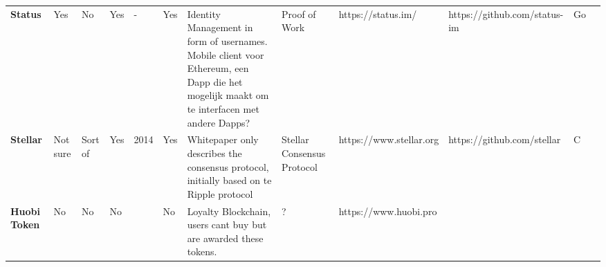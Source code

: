 \begin{table}[htbp]
\begin{adjustbox}{width=25cm, height=6cm, angle=270}
\begin{tabular}{llllrlp{17.915em}rlrrr}
      \rowcolor[rgb]{ .267,  .447,  .769} \textcolor[rgb]{ 1,  1,  1}{\textbf{Status}} & \cellcolor[rgb]{ .776,  .937,  .808}\textcolor[rgb]{ 0,  .38,  0}{Yes} & \cellcolor[rgb]{ 1,  .78,  .808}\textcolor[rgb]{ .612,  0,  .024}{No} & \cellcolor[rgb]{ .776,  .937,  .808}\textcolor[rgb]{ 0,  .38,  0}{Yes} & \multicolumn{1}{l}{\cellcolor[rgb]{ 1,  1,  1}-} & \cellcolor[rgb]{ .776,  .937,  .808}\textcolor[rgb]{ 0,  .38,  0}{Yes} & \cellcolor[rgb]{ .851,  .882,  .949}\textcolor[rgb]{ .188,  .329,  .588}{Identity Management in form of usernames. Mobile client voor Ethereum, een Dapp die het mogelijk maakt om te interfacen met andere Dapps?} & \multicolumn{1}{l}{\cellcolor[rgb]{ .851,  .882,  .949}\textcolor[rgb]{ .188,  .329,  .588}{Proof of Work}} & \cellcolor[rgb]{ 1,  1,  1}https://status.im/ & \multicolumn{1}{l}{\cellcolor[rgb]{ 1,  1,  1}https://github.com/status-im} & \multicolumn{1}{l}{\cellcolor[rgb]{ .851,  .882,  .949}\textcolor[rgb]{ .188,  .329,  .588}{Go}} & \cellcolor[rgb]{ 1,  1,  1} \\
      \rowcolor[rgb]{ .267,  .447,  .769} \textcolor[rgb]{ 1,  1,  1}{\textbf{Stellar}} & \cellcolor[rgb]{ 1,  .922,  .612}\textcolor[rgb]{ .612,  .341,  0}{Not sure} & \cellcolor[rgb]{ 1,  .922,  .612}\textcolor[rgb]{ .612,  .341,  0}{Sort of} & \cellcolor[rgb]{ .776,  .937,  .808}\textcolor[rgb]{ 0,  .38,  0}{Yes} & \cellcolor[rgb]{ .851,  .882,  .949}\textcolor[rgb]{ .188,  .329,  .588}{2014} & \cellcolor[rgb]{ .776,  .937,  .808}\textcolor[rgb]{ 0,  .38,  0}{Yes} & \cellcolor[rgb]{ 1,  1,  1}\textcolor[rgb]{ .188,  .329,  .588}{Whitepaper only describes the consensus protocol, initially based on te Ripple protocol} & \multicolumn{1}{l}{\cellcolor[rgb]{ .851,  .882,  .949}\textcolor[rgb]{ .188,  .329,  .588}{Stellar Consensus Protocol}} & \cellcolor[rgb]{ .851,  .882,  .949}\textcolor[rgb]{ .188,  .329,  .588}{https://www.stellar.org} & \multicolumn{1}{l}{\cellcolor[rgb]{ .851,  .882,  .949}\textcolor[rgb]{ .188,  .329,  .588}{https://github.com/stellar}} & \multicolumn{1}{l}{\cellcolor[rgb]{ .851,  .882,  .949}\textcolor[rgb]{ .188,  .329,  .588}{C}} & \cellcolor[rgb]{ .851,  .882,  .949}\textcolor[rgb]{ .188,  .329,  .588}{} \\
      \rowcolor[rgb]{ .267,  .447,  .769} \textcolor[rgb]{ 1,  1,  1}{\textbf{Huobi Token}} & \cellcolor[rgb]{ 1,  .78,  .808}\textcolor[rgb]{ .612,  0,  .024}{No} & \cellcolor[rgb]{ 1,  .78,  .808}\textcolor[rgb]{ .612,  0,  .024}{No} & \cellcolor[rgb]{ 1,  .78,  .808}\textcolor[rgb]{ .612,  0,  .024}{No} & \cellcolor[rgb]{ 1,  1,  1} & \cellcolor[rgb]{ 1,  .78,  .808}\textcolor[rgb]{ .612,  0,  .024}{No} & \cellcolor[rgb]{ .851,  .882,  .949}\textcolor[rgb]{ .188,  .329,  .588}{Loyalty Blockchain, users cant buy but are awarded these tokens.} & \multicolumn{1}{l}{\cellcolor[rgb]{ .851,  .882,  .949}\textcolor[rgb]{ .188,  .329,  .588}{?}} & \cellcolor[rgb]{ 1,  1,  1}https://www.huobi.pro & \cellcolor[rgb]{ 1,  1,  1} & \cellcolor[rgb]{ 1,  1,  1} & \cellcolor[rgb]{ 1,  1,  1} \\

\end{tabular}
\end{adjustbox}
\end{table}
